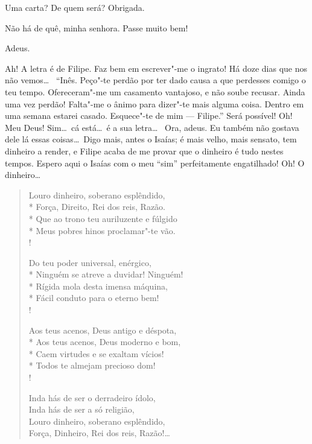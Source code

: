   Uma carta?  De quem será?
 Obrigada.

  Não há de quê, minha senhora. Passe muito bem!

 Adeus. 


\stagedir{\textsc{[Inês]}}

  Ah! A letra é de Filipe. Faz bem em escrever"-me o ingrato! Há doze
dias que nos não vemos\ldots\ 
“Inês.  Peço"-te perdão por ter dado causa a que perdesses comigo o teu tempo.
Ofereceram"-me um casamento vantajoso, e não soube recusar. Ainda uma vez perdão!
Falta"-me o ânimo para dizer"-te mais alguma coisa.
Dentro em uma semana estarei casado. Esquece"-te de mim --- Filipe.”
 Será possível! Oh! Meu Deus!  Sim\ldots\ cá
está\ldots\ é a sua letra\ldots\  Ora, adeus. Eu também não gostava dele lá essas coisas\ldots\ Digo
mais, antes o
Isaías; é mais velho, mais sensato, tem dinheiro a render, e Filipe acaba de me
provar que o dinheiro é tudo nestes tempos. Espero aqui o Isaías com o meu “sim”
perfeitamente engatilhado! Oh! O dinheiro\ldots

\begin{verse} 
Louro dinheiro, soberano esplêndido,\\*
Força, Direito, Rei dos reis, Razão.\\*
Que ao trono teu auriluzente e fúlgido\\*
Meus pobres hinos proclamar"-te vão.\\! 

Do teu poder universal, enérgico,\\*
Ninguém se atreve a duvidar! Ninguém!\\*
Rígida mola desta imensa máquina,\\*
Fácil conduto para o eterno bem!\\!

Aos teus acenos, Deus antigo e déspota,\\*
Aos teus acenos, Deus moderno e bom,\\*
Caem virtudes e se exaltam vícios!\\*
Todos te almejam precioso dom!\\!

Inda hás de ser o derradeiro ídolo,\\
Inda hás de ser a só religião,\\
Louro dinheiro, soberano esplêndido,\\
Força, Dinheiro, Rei dos reis, Razão!\ldots
\end{verse}

